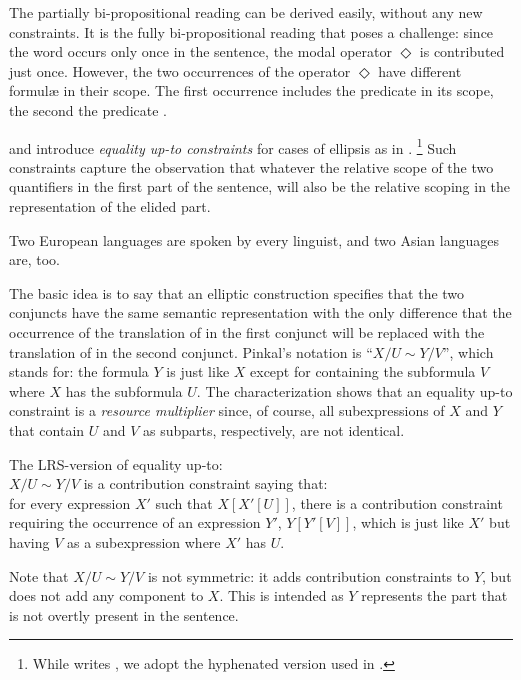 \documentclass[output=paper]{langsci/langscibook}
\begin{document}
The partially bi-propositional reading can be derived easily, without any new constraints. 
It is the fully bi-propositional reading that poses a challenge: 
since the word  occurs only once in the sentence, the modal operator $\Diamond$ 
is contributed just once. 
However, the two occurrences of the operator $\Diamond$ have different formul\ae{} in their scope.
The first occurrence includes the predicate  in its scope, the second the predicate .

\citet{Niehren:al:97} and \citet{Pinkal:99} introduce \emph{equality up-to constraints} for cases of ellipsis as in .%
\footnote{While \citet{Pinkal:99} writes , we adopt the hyphenated version used in \citet{Niehren:al:97}.
} %
Such constraints capture the observation that whatever the relative scope of the two quantifiers in the first part of the sentence,  will also be the relative scoping in the representation of the elided part. 

\ea \label{ex-Pinkal}
Two European languages are spoken by every linguist, and two Asian languages are, too.
\z 

The basic idea is to say that an elliptic construction specifies that the two conjuncts have the same semantic representation with the only difference that the occurrence of the translation of  in the first conjunct will be replaced with the translation of  in the second conjunct. 
Pinkal's notation is ``$X/U \sim Y/V$'', which stands for: the formula $Y$ is just like $X$ except for containing the subformula $V$ where $X$ has the subformula $U$. The characterization shows that an equality up-to constraint is a \emph{resource multiplier} since, of course, all subexpressions of $X$ and $Y$ that contain $U$ and $V$ as subparts, respectively, are not identical.

\ea
The LRS-version of equality up-to:\\
$X/U \sim Y/V$ is a contribution constraint saying that:\\
for every expression $X'$ such that $X[X'[U]]$, there is a contribution constraint requiring the occurrence of an expression $Y'$,  $Y[Y'[V]]$,  which is just like $X'$ but having $V$ as a subexpression where $X'$ has $U$.
\z 

Note that $X/U\sim Y/V$ is not symmetric: it adds contribution constraints to $Y$, but does not add any component to $X$. 
This is intended as $Y$ represents the part that is not overtly present in the sentence.
\end{document}
